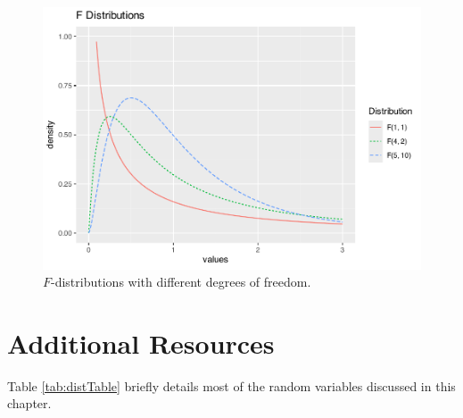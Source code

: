 \documentclass[
]{krantz}
\begin{document}
\begin{figure}

{\centering \includegraphics[width=0.6\linewidth]{bookdown-BeyondMLR_files/figure-latex/multF-1} 

}

\caption{\(F\)-distributions with different degrees of freedom.}\label{fig:multF}
\end{figure}

\hypertarget{additional-resources}{%
\section{Additional Resources}\label{additional-resources}}

Table \ref{tab:distTable} briefly details most of the random variables discussed in this chapter.
\end{document}
